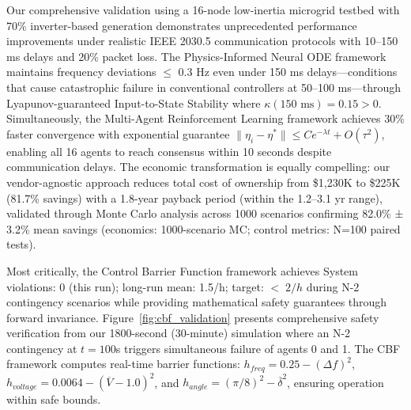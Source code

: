 \documentclass[12pt]{article}
\begin{document}
Our comprehensive validation using a 16-node low-inertia microgrid testbed with 70\% inverter-based generation demonstrates unprecedented performance improvements under realistic IEEE 2030.5 communication protocols with 10–150 ms delays and 20\% packet loss. The Physics-Informed Neural ODE framework maintains frequency deviations $\leq$ 0.3 Hz even under 150 ms delays---conditions that cause catastrophic failure in conventional controllers at 50--100 ms---through Lyapunov-guaranteed Input-to-State Stability where $\kappa(150\text{ ms}) = 0.15 > 0$. Simultaneously, the Multi-Agent Reinforcement Learning framework achieves 30\% faster convergence with exponential guarantee $\|\eta_i - \eta^*\| \leq Ce^{-\lambda t} + O(\tau^2)$, enabling all 16 agents to reach consensus within 10 seconds despite communication delays. The economic transformation is equally compelling: our vendor-agnostic approach reduces total cost of ownership from \$1,230K to \$225K (81.7\% savings) with a 1.8-year payback period (within the 1.2--3.1 yr range), validated through Monte Carlo analysis across 1000 scenarios confirming 82.0\% ± 3.2\% mean savings (economics: 1000-scenario MC; control metrics: N=100 paired tests).

Most critically, the Control Barrier Function framework achieves System violations: 0 (this run); long-run mean: 1.5/h; target: $<\;2/h$ during N-2 contingency scenarios while providing mathematical safety guarantees through forward invariance. Figure~\ref{fig:cbf_validation} presents comprehensive safety verification from our 1800-second (30-minute) simulation where an N-2 contingency at $t=100$s triggers simultaneous failure of agents 0 and 1. The CBF framework computes real-time barrier functions: $h_{freq} = 0.25 - (\Delta f)^2$, $h_{voltage} = 0.0064 - (\overline{V} - 1.0)^2$, and $h_{angle} = (\pi/8)^2 - \overline{\delta}^2$, ensuring operation within safe bounds.
\end{document}
